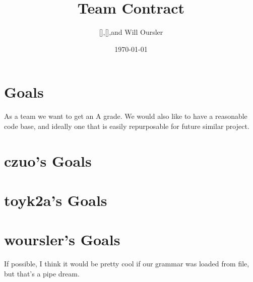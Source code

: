 


\author{ [],[],and Will Oursler} %
\address{ MIT, Cambridge, MA }
\title{Team Contract}
\date{\today}
\maketitle

\section{ Goals }
As a team we want to get an A grade. We would also like to have a reasonable code base, and ideally one that is easily repurposable for future similar project.

\section{ czuo's Goals }
\section{ toyk2a's Goals }
\section{ woursler's Goals }
If possible, I think it would be pretty cool if our grammar was loaded from file, but that's a pipe dream.




